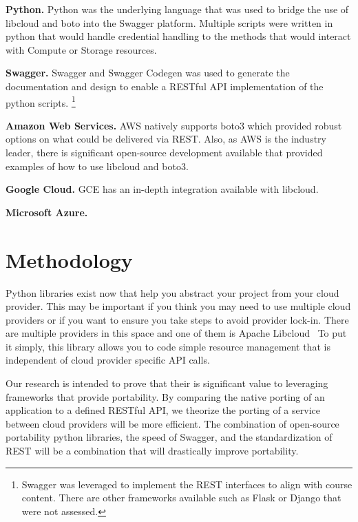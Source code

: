 \begin{description}

\item{\bf Python.} Python was the underlying language that was used to bridge
the use of libcloud and boto into the Swagger platform. Multiple scripts were
written in python that would handle credential handling to the methods that
would interact with Compute or Storage resources.
\item{\bf Swagger.} Swagger and Swagger Codegen was used to generate the
documentation and design to enable a RESTful API implementation of the python
scripts. \footnote{Swagger was leveraged to implement the REST interfaces to
align with course content. There are other frameworks available such as Flask or
Django that were not assessed.}
\item{\bf Amazon Web Services.} AWS natively supports boto3 which provided
robust options on what could be delivered via REST. Also, as AWS is the industry
leader, there is significant open-source development available that provided
examples of how to use libcloud and boto3.
\item{\bf Google Cloud.} GCE has an in-depth integration available with
libcloud. 
\item{\bf Microsoft Azure.} 

\end{description}

\section{Methodology}

Python libraries exist now that help you abstract your project from  your cloud
provider. This may be important if you think you may need to use multiple cloud
providers or if you want to ensure you take steps to avoid provider lock-in.
There are multiple providers in this space and one of them is Apache
Libcloud~\cite{hid-sp18-518-LibCloud} To put it simply, this library allows you
to code simple resource  management that is independent of cloud provider
specific API calls.

Our research is intended to prove that their is significant value to leveraging
frameworks that provide portability. By comparing the native porting of an
application to a defined RESTful API, we theorize the porting of a service
between cloud providers will be more efficient. The combination of open-source
portability python libraries, the speed of Swagger, and the standardization of
REST will be a combination that will drastically improve portability.

